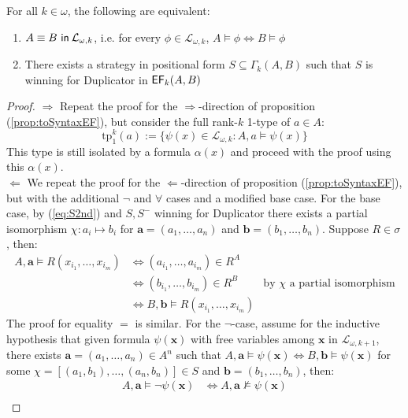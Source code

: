 \begin{prop}
For all $k \in \omega$, the following are equivalent:
\begin{enumerate}[label=(\arabic*)$_{k}$]
\item ${A \equiv B \ \mathsf{in}\: \mathcal{L}_{\omega,k}}$, i.e. for every $\phi \in \mathcal{L}_{\omega,k}$, $A \vDash \phi \Leftrightarrow B \vDash \phi$
\item There exists a strategy in positional form $S \subseteq \Gamma_{k}(A,B)$ such that $S$ is winning for Duplicator in ${\mathsf{EF}_{k}(A,B)}$ 
\end{enumerate}
\begin{proof}
$\Rightarrow$ Repeat the proof for the $\Rightarrow$-direction of proposition (\ref{prop:toSyntaxEF}), but consider the full rank-$k$ 1-type of $a \in A$:
$$\text{tp}^{k}_{1}(a) := \{\psi(x) \in \mathcal{L}_{\omega,k}: A,a \vDash \psi(x) \} $$ 
This type is still isolated by a formula $\alpha(x)$ and proceed with the proof using this $\alpha(x)$. \\
$\Leftarrow$ We repeat the proof for the $\Leftarrow$-direction of proposition (\ref{prop:toSyntaxEF}), but with the additional $\neg$ and $\forall$ cases and a modified base case. For the base case, by (\ref{eq:S2nd}) and $S,S^{-}$ winning for Duplicator there exists a partial isomorphism $\chi:a_{i} \mapsto b_{i}$ for $\mathbf{a} = (a_{1},\dots,a_{n})$ and $\mathbf{b} = (b_{1},\dots,b_{n})$. Suppose $R \in \sigma$, then: 
\begin{align*}
A,\mathbf{a} \vDash R(x_{i_{1}},\dots,x_{i_{m}}) &\Leftrightarrow (a_{i_{1}},\dots,a_{i_{m}}) \in R^{A} \\
&\Leftrightarrow (b_{i_{1}},\dots,b_{i_{m}}) \in R^{B} & \text{by $\chi$ a partial isomorphism} \\
&\Leftrightarrow B,\mathbf{b} \vDash R(x_{i_{1}},\dots,x_{i_{m}})
\end{align*}
The proof for equality $=$ is similar. For the $\neg$-case, assume for the inductive hypothesis that given formula $\psi(\mathbf{x})$ with free variables among $\mathbf{x}$ in $\mathcal{L}_{\omega,k+1}$, there exists $\mathbf{a} = (a_{1},\dots,a_{n}) \in A^{n}$ such that $A,\mathbf{a} \vDash \psi(\mathbf{x}) \Leftrightarrow B,\mathbf{b} \vDash \psi(\mathbf{x})$ for some $\chi = [(a_{1},b_{1}),\dots,(a_{n},b_{n})] \in S$ and $\mathbf{b} = (b_{1},\dots,b_{n})$, then:
\begin{align*}
A,\mathbf{a} \vDash \neg\psi(\mathbf{x}) &\Leftrightarrow A,\mathbf{a} \not\vDash \psi(\mathbf{x}) \\

\end{align*}
\end{proof}
\end{prop}
